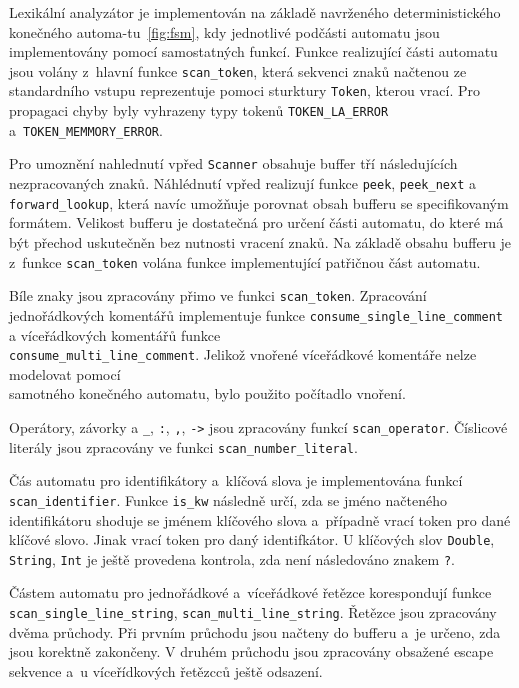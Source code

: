 \documentclass[11pt]{article}
\begin{document}
Lexikální analyzátor je implementován na základě navrženého deterministického konečného automa-tu~\href{fig:fsm}{\ref{fig:fsm}}, kdy jednotlivé podčásti automatu
jsou implementovány pomocí samostatných funkcí. Funkce realizující části automatu jsou volány z~hlavní funkce \texttt{scan\_token},
která sekvenci znaků načtenou ze standardního vstupu reprezentuje pomoci sturktury \texttt{Token}, kterou vrací. Pro propagaci chyby byly vyhrazeny
typy tokenů \texttt{TOKEN\_LA\_ERROR} a~\texttt{TOKEN\_MEMMORY\_ERROR}.

Pro umoznění nahlednutí vpřed \texttt{Scanner} obsahuje buffer tří následujících nezpracovaných znaků.
Náhlédnutí vpřed realizují funkce \texttt{peek}, \texttt{peek\_next} a \texttt{forward\_lookup}, která navíc umožňuje
porovnat obsah bufferu se specifikovaným formátem. Velikost bufferu je dostatečná pro určení části automatu,
do které má být přechod uskutečněn bez nutnosti vracení znaků. Na základě obsahu bufferu je z~funkce \texttt{scan\_token} volána 
funkce implementující patřičnou část automatu.


Bíle znaky jsou zpracovány přimo ve funkci \texttt{scan\_token}. Zpracování jednořádkových komentářů implementuje funkce
\texttt{consume\_single\_line\_comment} a víceřádkových komentářů funkce \\ \texttt{consume\_multi\_line\_comment}. Jelikož vnořené
víceřádkové komentáře nelze modelovat pomocí\\ samotného konečného automatu, bylo použito počítadlo vnoření.

Operátory, závorky a \texttt{\_}, \texttt{:}, \texttt{,}, \texttt{->} jsou zpracovány funkcí \texttt{scan\_operator}.
Číslicové literály jsou zpracovány ve funkci \texttt{scan\_number\_literal}.

Čás automatu pro identifikátory a~klíčová slova je implementována funkcí \texttt{scan\_identifier}.
Funkce \texttt{is\_kw} následně určí, zda se jméno načteného identifikátoru shoduje se jménem klíčového slova a~případně
vrací token pro dané klíčové slovo. Jinak vrací token pro daný identifkátor. U klíčových slov \texttt{Double}, \texttt{String}, \texttt{Int}
je ještě provedena kontrola, zda není následováno znakem \texttt{?}.

Částem automatu pro jednořádkové a~víceřádkové řetězce korespondují funkce \\ \texttt{scan\_single\_line\_string}, \texttt{scan\_multi\_line\_string}.
Řetězce jsou zpracovány dvěma průchody. Při prvním průchodu jsou načteny do bufferu a~je určeno, zda jsou korektně zakončeny. V druhém průchodu
jsou zpracovány obsažené escape sekvence a~u víceřídkových řetězcců ještě odsazení.
\end{document}

